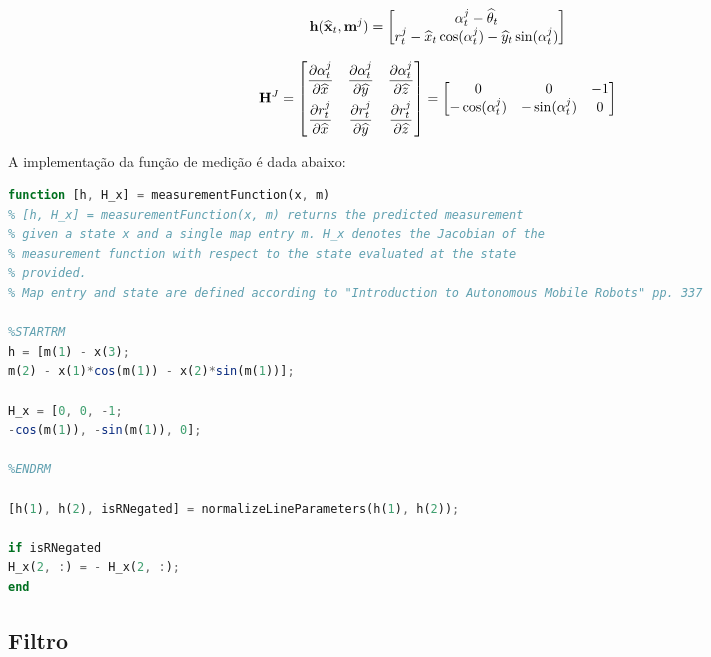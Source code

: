 \begin{equation}\label{eq:h}
	\mathbf{h}(\widehat{\mathbf{x}}_t,\mathbf{m}^j) = \begin{bmatrix}
		\alpha_t^j - \widehat{\theta}_t \\
		r_t^j - \widehat{x}_t\cos(\alpha_t^j) - \widehat{y}_t\sin(\alpha_t^j)
	\end{bmatrix}
\end{equation}

\begin{equation}\label{eq:H}
	\mathbf{H}^J = \begin{bmatrix}
		\dfrac{\partial \alpha_t^j}{\partial \widehat{x}} & \dfrac{\partial \alpha_t^j}{\partial \widehat{y}} & \dfrac{\partial \alpha_t^j}{\partial \widehat{z}} \\[2ex]
		\dfrac{\partial r_t^j}{\partial \widehat{x}} & \dfrac{\partial r_t^j}{\partial \widehat{y}} & \dfrac{\partial r_t^j}{\partial \widehat{z}}
	\end{bmatrix} = \begin{bmatrix}
		0 & 0 & -1 \\
		-\cos(\alpha_t^j) & -\sin(\alpha_t^j) & 0
	\end{bmatrix}
\end{equation}

A implementação da função de medição é dada abaixo:

\begin{lstlisting}[language=Octave]
function [h, H_x] = measurementFunction(x, m)
% [h, H_x] = measurementFunction(x, m) returns the predicted measurement
% given a state x and a single map entry m. H_x denotes the Jacobian of the
% measurement function with respect to the state evaluated at the state
% provided.
% Map entry and state are defined according to "Introduction to Autonomous Mobile Robots" pp. 337

%STARTRM
h = [m(1) - x(3);
m(2) - x(1)*cos(m(1)) - x(2)*sin(m(1))];

H_x = [0, 0, -1;
-cos(m(1)), -sin(m(1)), 0];

%ENDRM

[h(1), h(2), isRNegated] = normalizeLineParameters(h(1), h(2));

if isRNegated 
H_x(2, :) = - H_x(2, :);
end
\end{lstlisting}

\clearpage


\subsection{Filtro}

